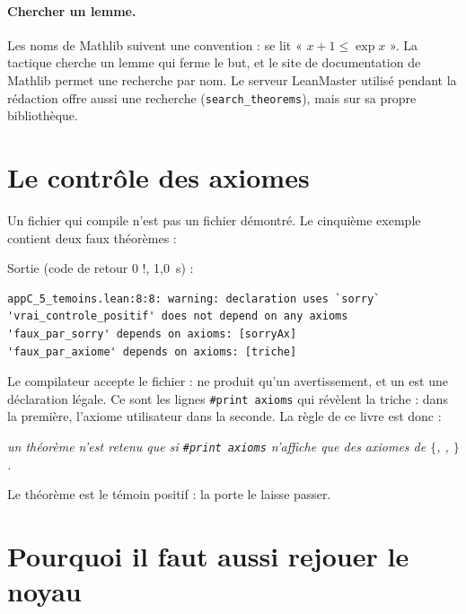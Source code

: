 \paragraph{Chercher un lemme.} Les noms de Mathlib suivent une convention :  se lit
« $x+1\le\exp x$ ». La tactique  cherche un lemme qui ferme le but, et le site de documentation de
Mathlib permet une recherche par nom. Le serveur LeanMaster utilisé pendant la rédaction offre aussi une recherche
(\texttt{search\_theorems}), mais sur sa propre bibliothèque.

\section{Le contrôle des axiomes}\label{appC:sec:axiomes}

Un fichier qui compile n'est pas un fichier démontré. Le cinquième exemple contient deux faux théorèmes :

\noindent Sortie (code de retour $0$ !, 1,0~s) :
\begin{lstlisting}[style=appC,language={}]
appC_5_temoins.lean:8:8: warning: declaration uses `sorry`
'vrai_controle_positif' does not depend on any axioms
'faux_par_sorry' depends on axioms: [sorryAx]
'faux_par_axiome' depends on axioms: [triche]
\end{lstlisting}
Le compilateur accepte le fichier :  ne produit qu'un avertissement, et un  est une déclaration
légale. Ce sont les lignes \texttt{\#print axioms} qui révèlent la triche :  dans la première, l'axiome
utilisateur  dans la seconde. La règle de ce livre est donc :
\begin{center}
\emph{un théorème n'est retenu que si \texttt{\#print axioms} n'affiche que des axiomes de
$\{$, , $\}$.}
\end{center}
Le théorème  est le témoin positif : la porte le laisse passer.

\section{Pourquoi il faut aussi rejouer le noyau}\label{appC:sec:leanchecker}

